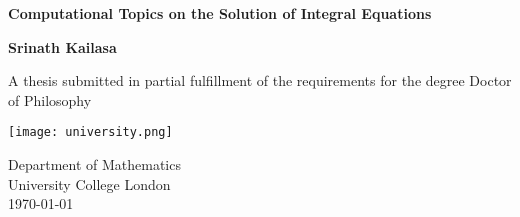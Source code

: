 \begin{titlepage}
    \begin{center}
        \vspace*{1cm}

        \Huge
        \textbf{Computational Topics on the Solution of Integral Equations}

        \Large
        \vspace{0.5cm}

        \vfill

        \textbf{Srinath Kailasa}

        \vspace{5cm}

        A thesis submitted in partial fulfillment of the requirements for the
        degree Doctor of Philosophy 

        \vspace{0.8cm}

        \texttt{[image: university.png]}

        \large
        Department of Mathematics\\
        University College London\\
        \today

    \end{center}
 \end{titlepage}